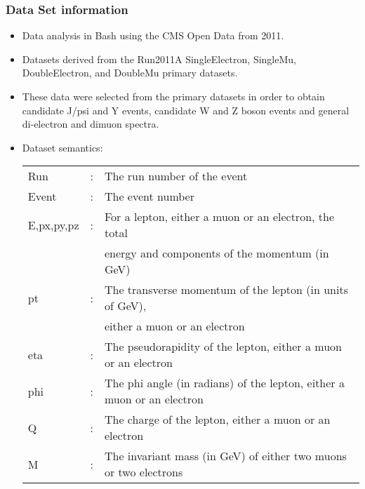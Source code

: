 \documentclass[8pt]{beamer}
\begin{document}
\begin{frame}
\frametitle{Data Set information}
\begin{itemize}
\item Data analysis in Bash using the CMS Open Data from 2011.\\[0.5cm]
\item Datasets derived from the Run2011A SingleElectron, SingleMu,
DoubleElectron, and DoubleMu primary datasets.\\[0.5cm]  
\item These data were selected from the primary datasets in order to obtain candidate
J/psi and Y events, candidate W and Z boson events and general di-electron and dimuon 
spectra.\\[0.5cm]
\item Dataset semantics:
\begin{table}[htbp]
\begin{center}
\begin{tabular}{l l l}
Run & : & The run number of the event\\
Event & : & The event number\\
E,px,py,pz & : & For a lepton, either a muon or an electron, the total\\
	   &   & energy and components of the momentum (in GeV)\\
pt         & : & The transverse momentum of the lepton (in units of GeV),\\
	   &   & either a muon or an electron\\
eta       & : & The pseudorapidity of the lepton, either a muon or an electron\\
phi   & : & The phi angle (in radians) of the lepton, either a muon or an electron\\
Q     & : & The charge of the lepton, either a muon or an electron\\
M     & : & The invariant mass (in GeV) of either two muons or two electrons\\
\end{tabular}
\end{center}
\end{table}
\end{itemize}
\end{frame}
\end{document}
